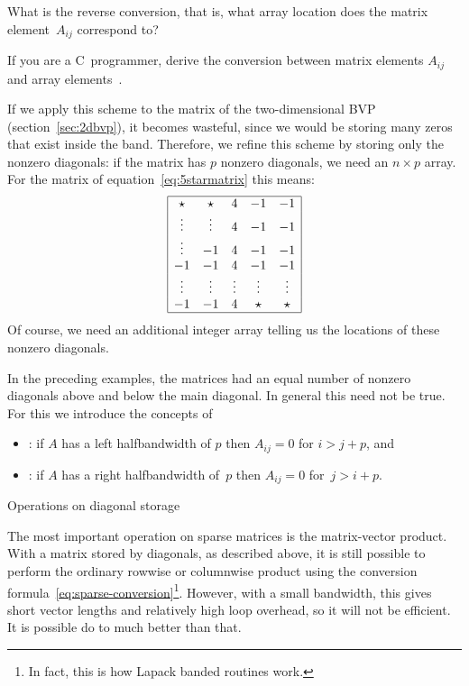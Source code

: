 \begin{exercise}
  What is the reverse conversion, that is, what array location
   does the matrix element~$A_{ij}$ correspond to?
\end{exercise}

\begin{exercise}
  If you are a C~programmer, derive the conversion between matrix
  elements $A_{ij}$ and array elements~.
\end{exercise}

If we apply this scheme to the matrix of the two-dimensional \ac{BVP}
(section~\ref{sec:2dbvp}), it becomes wasteful, since we would be
storing many zeros that exist inside the band. Therefore, we refine
this scheme by storing only the nonzero diagonals: if the matrix has
$p$ nonzero diagonals, we need an $n\times p$ array. For the matrix of
equation~\eqref{eq:5starmatrix} this means:
\[
\begin{array}{|ccccc|}
  \hline
  \star&\star&4&-1&-1\\
  \vdots&\vdots&4&-1&-1\\
  \vdots&-1&4&-1&-1\\
  -1&-1&4&-1&-1\\
  \vdots&\vdots&\vdots&\vdots&\vdots\\
  -1&-1&4&\star&\star\\ \hline
\end{array}
\]
Of course, we need an additional integer array telling us the
locations of these nonzero diagonals.

In the preceding examples, the matrices had an equal number of nonzero
diagonals above and below the main diagonal. In general this need not
be true. For this we introduce the concepts of
\begin{itemize}
\item {}: if $A$ has a left
  halfbandwidth of $p$ then $A_{ij}=0$ for $i>j+p$, and
\item {}: if $A$ has a right
  halfbandwidth of~$p$ then $A_{ij}=0$ for~\mbox{$j>i+p$}.
\end{itemize}


 {Operations on diagonal storage}

The most important operation on sparse matrices is the matrix-vector
product. With a matrix stored by diagonals, as described above, it is
still possible to perform the ordinary rowwise or columnwise product using the
conversion formula~\eqref{eq:sparse-conversion}\footnote{In fact,
  this is how Lapack banded routines work.}.
%
However, with
a small bandwidth, this gives short vector lengths and relatively high
loop overhead, so it will not be efficient. It is possible do to much
better than that.

